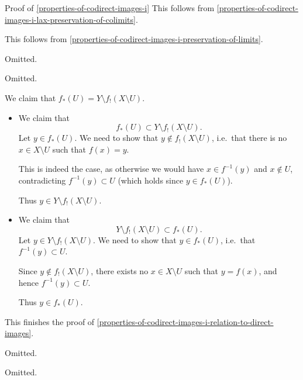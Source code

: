 \begin{Proof}{Proof of \cref{properties-of-codirect-images-i}}
    This follows from \cref{properties-of-codirect-images-i-lax-preservation-of-colimits}.

    This follows from \cref{properties-of-codirect-images-i-preservation-of-limits}.

    Omitted.

    Omitted.

    We claim that $f_{*}(U)=Y\setminus f_{!}(X\setminus U)$.
    \begin{itemize}
        \item{}We claim that
            \[
                f_{*}(U)%
                \subset%
                Y\setminus f_{!}(X\setminus U).%
            \]%
            Let $y\in f_{*}(U)$. We need to show that $y\nin f_{!}(X\setminus U)$, i.e.\ that there is no $x\in X\setminus U$ such that $f(x)=y$.

            This is indeed the case, as otherwise we would have $x\in f^{-1}(y)$ and $x\nin U$, contradicting $f^{-1}(y)\subset U$ (which holds since $y\in f_{*}(U)$).

            Thus $y\in Y\setminus f_{!}(X\setminus U)$.
        \item{}We claim that
            \[
                Y\setminus f_{!}(X\setminus U)%
                \subset%
                f_{*}(U).%
            \]%
            Let $y\in Y\setminus f_{!}(X\setminus U)$. We need to show that $y\in f_{*}(U)$, i.e.\ that $f^{-1}(y)\subset U$.

            Since $y\nin f_{!}(X\setminus U)$, there exists no $x\in X\setminus U$ such that $y=f(x)$, and hence $f^{-1}(y)\subset U$.

            Thus $y\in f_{*}(U)$.
    \end{itemize}
    This finishes the proof of \cref{properties-of-codirect-images-i-relation-to-direct-images}.

    Omitted.

    Omitted.
\end{Proof}
